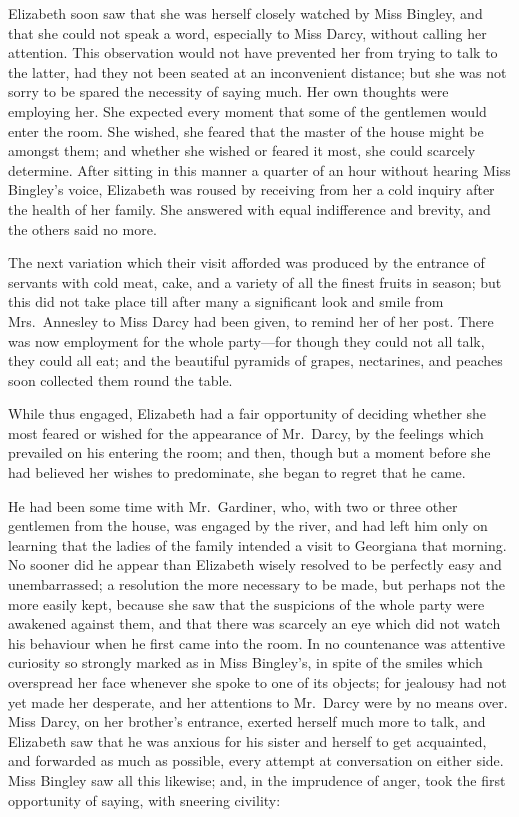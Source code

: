 \documentclass[12pt,english]{book}
\begin{document}
Elizabeth soon saw that she was herself closely watched by Miss Bingley,
and that she could not speak a word, especially to Miss Darcy, without
calling her attention. This observation would not have prevented her
from trying to talk to the latter, had they not been seated at an
inconvenient distance; but she was not sorry to be spared the necessity
of saying much. Her own thoughts were employing her. She expected
every moment that some of the gentlemen would enter the room. She
wished, she feared that the master of the house might be amongst them;
and whether she wished or feared it most, she could scarcely determine.
After sitting in this manner a quarter of an hour without hearing
Miss Bingley's voice, Elizabeth was roused by receiving from her a
cold inquiry after the health of her family. She answered with equal
indifference and brevity, and the others said no more.

The next variation which their visit afforded was produced by the
entrance of servants with cold meat, cake, and a variety of all the
finest fruits in season; but this did not take place till after many
a significant look and smile from Mrs.\ Annesley to Miss Darcy had
been given, to remind her of her post. There was now employment for
the whole party\mbox{---}for though they could not all talk, they
could all eat; and the beautiful pyramids of grapes, nectarines, and
peaches soon collected them round the table.

While thus engaged, Elizabeth had a fair opportunity of deciding whether
she most feared or wished for the appearance of Mr.\ Darcy, by the
feelings which prevailed on his entering the room; and then, though
but a moment before she had believed her wishes to predominate, she
began to regret that he came.

He had been some time with Mr.\ Gardiner, who, with two or three
other gentlemen from the house, was engaged by the river, and had
left him only on learning that the ladies of the family intended a
visit to Georgiana that morning. No sooner did he appear than Elizabeth
wisely resolved to be perfectly easy and unembarrassed; a resolution
the more necessary to be made, but perhaps not the more easily kept,
because she saw that the suspicions of the whole party were awakened
against them, and that there was scarcely an eye which did not watch
his behaviour when he first came into the room. In no countenance
was attentive curiosity so strongly marked as in Miss Bingley's, in
spite of the smiles which overspread her face whenever she spoke to
one of its objects; for jealousy had not yet made her desperate, and
her attentions to Mr.\ Darcy were by no means over. Miss Darcy, on
her brother's entrance, exerted herself much more to talk, and Elizabeth
saw that he was anxious for his sister and herself to get acquainted,
and forwarded as much as possible, every attempt at conversation on
either side. Miss Bingley saw all this likewise; and, in the imprudence
of anger, took the first opportunity of saying, with sneering civility:
\end{document}
